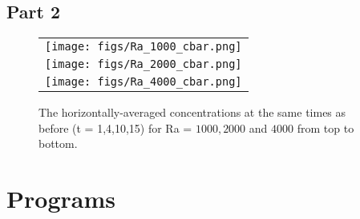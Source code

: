 \documentclass{article}
\begin{document}
\subsection{Part 2}
\begin{figure}[!h]
\centering
\begin{tabular}{c}
\texttt{[image: figs/Ra\_1000\_cbar.png]} \\
\texttt{[image: figs/Ra\_2000\_cbar.png]} \\
\texttt{[image: figs/Ra\_4000\_cbar.png]} \\
\end{tabular}
\caption{The horizontally-averaged concentrations at the same times as before (t = 1,4,10,15) for Ra = $1000, 2000$ and $4000$ from top to bottom.}
\end{figure}



\section{Programs}

\end{document}
